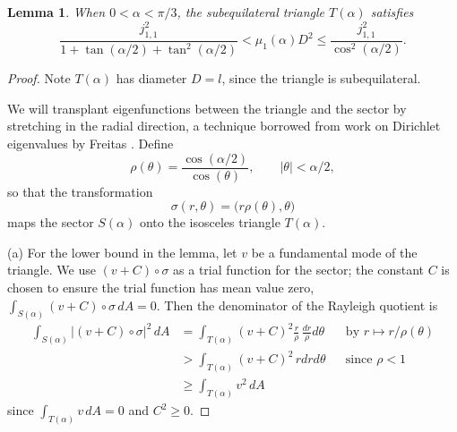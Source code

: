 \documentclass[11pt,reqno]{amsart}
\newtheorem{lemma}[theorem]{Lemma}
\numberwithin{equation}{section}
\begin{document}
\begin{lemma}\label{boundsiso}
When $0 < \alpha < \pi/3$, the subequilateral triangle $T(\alpha)$ satisfies
\[
\frac{j_{1,1}^2}{1+\tan(\alpha/2)+\tan^2(\alpha/2)} < \mu_1(\alpha) D^2 \leq \frac{j_{1,1}^2}{\cos^2(\alpha/2)} .
\]
\end{lemma}

\begin{proof}
Note $T(\alpha)$ has diameter $D=l$, since the triangle is subequilateral.

We will transplant eigenfunctions between the triangle and the sector by stretching in the radial direction, a technique borrowed from work on Dirichlet eigenvalues by Freitas \cite[\S3]{F07}. Define
\[
\rho(\theta) = \frac{\cos(\alpha/2)}{\cos (\theta)} , \qquad |\theta| < \alpha/2 ,
\]
so that the transformation
\[
\sigma(r,\theta) = \big(r \rho(\theta),\theta \big)
\]
maps the sector $S(\alpha)$ onto the isosceles triangle
$T(\alpha)$.

\smallskip
(a) For the lower bound in the lemma, let $v$ be a fundamental mode of the triangle. We use $(v+C)\circ \sigma$ as a trial function for the sector; the constant $C$ is chosen to ensure the trial function has mean value zero, $\int_{S(\alpha)} (v+C) \circ \sigma \, dA =0$. Then the denominator of the Rayleigh quotient is
\begin{align*}
\int_{S(\alpha)} |(v+C)\circ \sigma|^2 \, dA
& = \int_{T(\alpha)} (v+C)^2 \frac{r}{\rho} \, \frac{dr}{\rho}d\theta && \text{by $r \mapsto r/\rho(\theta)$} \\
& > \int_{T(\alpha)} (v+C)^2 \, rdrd\theta && \text{since $\rho < 1$} \\
& \geq \int_{T(\alpha)} v^2 \,dA
\end{align*}
since $\int_{T(\alpha)} v \, dA = 0$ and $C^2 \geq 0$.


\end{proof}
\end{document}
